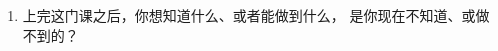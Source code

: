 \begin{enumerate}
  \begin{itemize}
    
  \item
    我不知道从哪儿下手。
    
  \item
    我靠大量网上搜索、反复试错，能磕磕绊绊做出来。
    
  \item
    我几乎不用外部帮助就能很快做出来。\\
    
  \end{itemize}

\item
  上完这门课之后，你想知道什么、或者能做到什么，
  是你现在不知道、或做不到的？

\end{enumerate}
